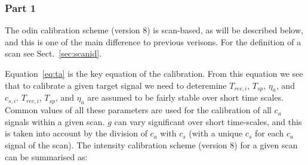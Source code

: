 \documentclass[12pt]{article}
\begin{document}
\subsubsection{Part 1}
\label{sec:part1}
The odin calibration scheme (version 8) is scan-based,
as will be described below,
and this is one of the main difference to previous verisons.
For the definition of a scan see Sect.~\ref{sec:scanid}.

Equation~\ref{eq:ta} is the key equation of the calibration. 
From this equation we see that to calibrate a given target signal 
we need to deteremine \(T_{rec,i}\), \(T_{sp}\), \(\eta_{a}\),
and \(c_{s,i}\). \(T_{rec,i}\), \(T_{sp}\), and \(\eta_{a}\)
are assumed to be fairly stable over short time scales.
Common values of all these parameters are used for
the calibration of all \(c_{a}\) signals within a given scan.
\(g\) can vary significant over short time-scales,
and this is taken into account by the division of \(c_{a}\) with
\(c_{s}\) (with a unique \(c_{s}\) for each \(c_{a}\) 
signal of the scan). The intensity calibration scheme (version 8) 
for a given scan can be summarised as:
\end{document}
